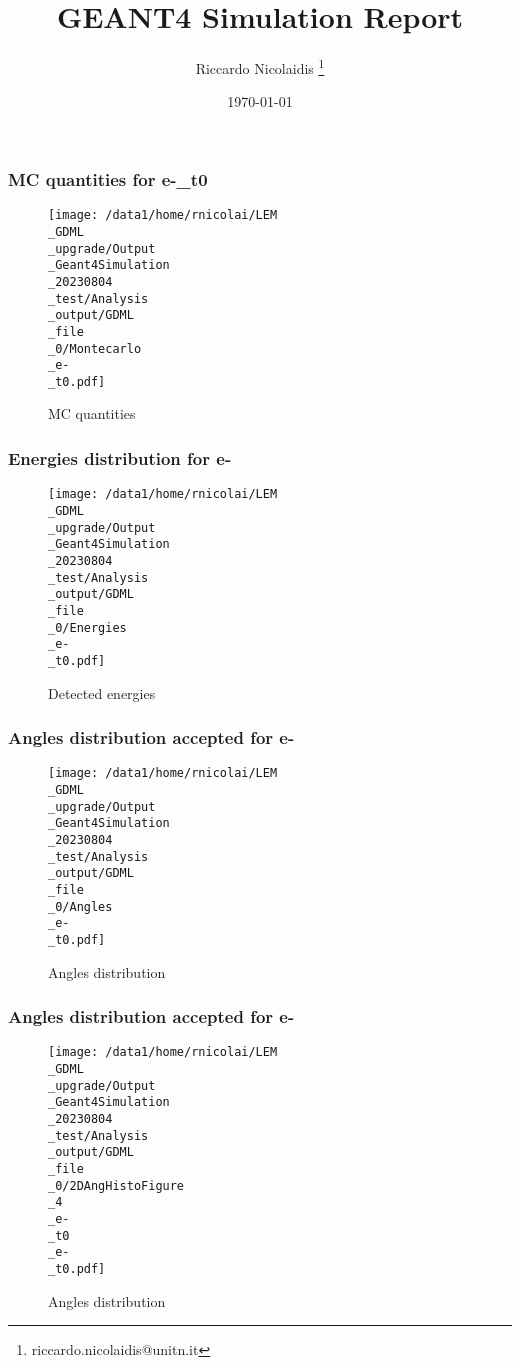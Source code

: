 \documentclass[8pt]{beamer}
\title{GEANT4 Simulation Report}
\author{Riccardo Nicolaidis \footnote{riccardo.nicolaidis@unitn.it}}
\date{\today}
\begin{document}
        
            \begin{frame}
                \titlepage
            \end{frame}
            
            \begin{frame}
                \frametitle{MC quantities for e-\_t0}
            
        \begin{figure}[h]
            \centering
            \texttt{[image: /data1/home/rnicolai/LEM\\\_GDML\\\_upgrade/Output\\\_Geant4Simulation\\\_20230804\\\_test/Analysis\\\_output/GDML\\\_file\\\_0/Montecarlo\\\_e-\\\_t0.pdf]}
            \caption{MC quantities}
        \end{figure}
        
            \end{frame}
            
            \begin{frame}
                \frametitle{Energies distribution for e-}
            
        \begin{figure}[h]
            \centering
            \texttt{[image: /data1/home/rnicolai/LEM\\\_GDML\\\_upgrade/Output\\\_Geant4Simulation\\\_20230804\\\_test/Analysis\\\_output/GDML\\\_file\\\_0/Energies\\\_e-\\\_t0.pdf]}
            \caption{Detected energies}
        \end{figure}
        
            \end{frame}
            
            \begin{frame}
                \frametitle{Angles distribution accepted for e-}
            
        \begin{figure}[h]
            \centering
            \texttt{[image: /data1/home/rnicolai/LEM\\\_GDML\\\_upgrade/Output\\\_Geant4Simulation\\\_20230804\\\_test/Analysis\\\_output/GDML\\\_file\\\_0/Angles\\\_e-\\\_t0.pdf]}
            \caption{Angles distribution}
        \end{figure}
        
            \end{frame}
            
            \begin{frame}
                \frametitle{Angles distribution accepted for e-}
            
        \begin{figure}[h]
            \centering
            \texttt{[image: /data1/home/rnicolai/LEM\\\_GDML\\\_upgrade/Output\\\_Geant4Simulation\\\_20230804\\\_test/Analysis\\\_output/GDML\\\_file\\\_0/2DAngHistoFigure\\\_4\\\_e-\\\_t0\\\_e-\\\_t0.pdf]}
            \caption{Angles distribution}
        \end{figure}
        
            \end{frame}
            
\end{document}
